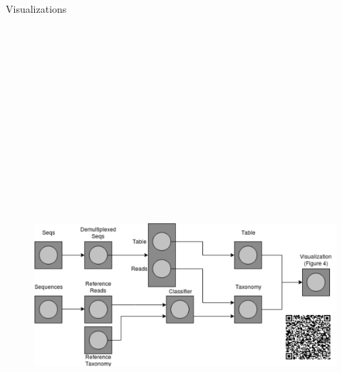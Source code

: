 \documentclass[final]{beamer}
\newlength{\colwidth}
\begin{document}
\begin{frame}[t]
\begin{columns}[t]
\begin{column}{\colwidth}
  \begin{block}{Visualizations}
    \begin{figure}[tph!]
      {\includegraphics[height=20cm]{assets/provenance}}
    \end{figure}


\end{block}
\end{column}
\end{columns}
\end{frame}
\end{document}
